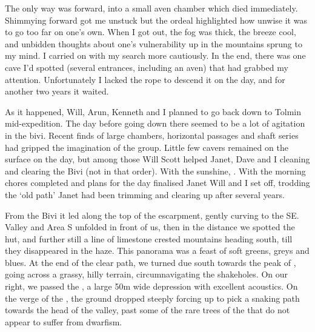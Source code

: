 The only way was forward, into a small aven chamber which died immediately. Shimmying forward got me unstuck but the ordeal highlighted how unwise it was to go too far on one’s own. When I got out, the fog was thick, the breeze cool, and unbidden thoughts about one’s vulnerability up in the mountains sprung to my mind. I carried on with my search more cautiously. In the end, there was one cave I’d spotted (several entrances, including an aven) that had grabbed my attention. Unfortunately I lacked the rope to descend it on the day, and for another two years it waited.

As it happened, Will, Arun, Kenneth and I planned to go back down to Tolmin mid-expedition. The day before going down there seemed to be a lot of agitation in the bivi. Recent finds of large chambers, horizontal passages and shaft series had gripped the imagination of the group. Little few cavers remained on the surface on the day, but among those Will Scott helped Janet, Dave and I cleaning and clearing the Bivi (not in that order). With the sunshine, . With the morning chores completed and plans for the day finalised Janet Will and I set off, trodding the ‘old  path’ Janet had been trimming and clearing up after several years. 

From the Bivi it led along the top of the  escarpment, gently curving to the SE.  Valley and Area S unfolded in front of us, then in the distance we spotted the  hut, and further still a line of limestone crested mountains heading south, till they disappeared in the haze. This panorama was a feast of soft greens, greys and blues. At the end of the clear path, we turned due south towards the peak of , going across a grassy, hilly terrain, circumnavigating the shakeholes. On our right, we passed the , a large 50m wide depression with excellent acoustics. On the verge of the , the ground dropped steeply forcing up to pick a snaking path towards the head of the valley, past some of the rare trees of the  that do not appear to suffer from dwarfism. 

